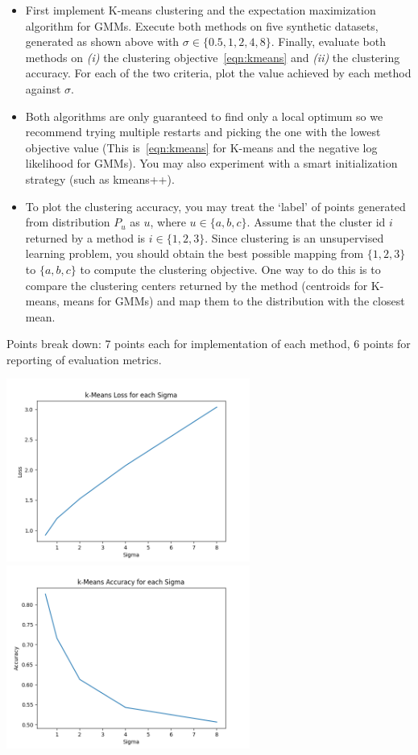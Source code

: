 \begin{itemize}
\item First implement K-means clustering and the expectation maximization algorithm for GMMs.
Execute both methods on five synthetic datasets,
generated as shown above with $\sigma \in \{0.5, 1, 2, 4, 8\}$. Finally, evaluate both methods on \emph{(i)} the clustering objective~\eqref{eqn:kmeans} and \emph{(ii)}  the clustering accuracy. For each of the two criteria, plot the value achieved by each method against $\sigma$.

\item Both algorithms are only guaranteed to find only a local optimum so we recommend trying multiple
restarts and picking the one with the lowest objective value (This is~\eqref{eqn:kmeans} for K-means and the negative log likelihood for GMMs).
You may also experiment with a smart initialization
strategy (such as kmeans++).

\item
To plot the clustering accuracy,  you may treat the `label' of points generated from distribution
$P_u$ as $u$, where $u\in \{a, b, c\}$.
Assume that the cluster id $i$ returned by a method is $i\in \{1, 2, 3\}$.
Since clustering is an unsupervised learning problem, you should obtain the best possible mapping
from $\{1, 2, 3\}$ to $\{a, b, c\}$ to compute the clustering objective.
One way to do this is to compare the clustering centers returned by the method (centroids for
K-means, means for GMMs) and map them to the distribution with the closest mean.

\end{itemize}

Points break down: 7 points each for implementation of each method, 6 points for reporting of
evaluation metrics.

\includegraphics[width=3.15in]{../figs/kmeans_loss.png} \hspace{0.1in}
\includegraphics[width=3.15in]{../figs/kmeans_accuracy.png} \\

